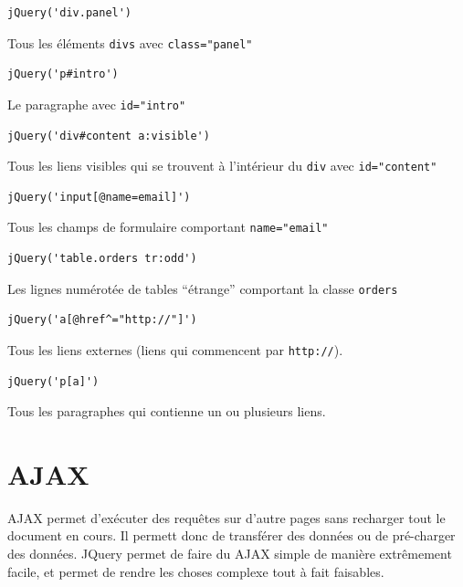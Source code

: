 \documentclass[10pt,a4paper,titlepage]{article}
\begin{document}
\begin{lstlisting}
jQuery('div.panel')
\end{lstlisting}

Tous les éléments \texttt{divs} avec \texttt{class="panel"}

\begin{lstlisting}
jQuery('p#intro')
\end{lstlisting}

Le paragraphe avec \texttt{id="intro"}

\begin{lstlisting}
jQuery('div#content a:visible')
\end{lstlisting}

Tous les liens visibles qui se trouvent à l'intérieur du \texttt{div} avec \texttt{id="content"}

\begin{lstlisting}
jQuery('input[@name=email]')
\end{lstlisting}

Tous les champs de formulaire comportant \texttt{name="email"}

\begin{lstlisting}
jQuery('table.orders tr:odd')
\end{lstlisting}

Les lignes numérotée de tables “étrange” comportant la classe \texttt{orders}

\begin{lstlisting}
jQuery('a[@href^="http://"]')
\end{lstlisting}

Tous les liens externes (liens qui commencent par \verb!http://!).

\begin{lstlisting}
jQuery('p[a]')
\end{lstlisting}

Tous les paragraphes qui contienne un ou plusieurs liens.


\newpage
\section{AJAX}

AJAX permet d'exécuter des requêtes sur d'autre pages sans recharger tout le document en cours. Il permett donc de transférer des données ou de pré-charger des données. JQuery permet de faire du AJAX simple de manière extrêmement facile, et permet de rendre les choses complexe tout à fait faisables. 
\end{document}
